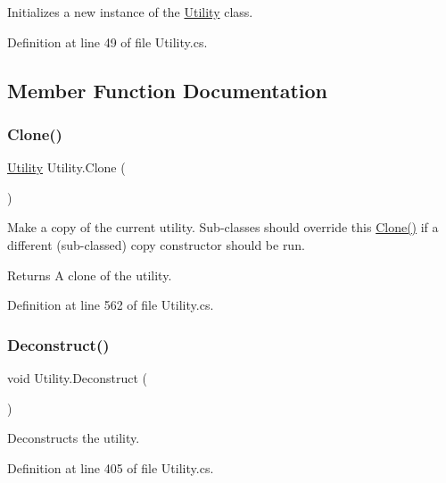 Initializes a new instance of the \hyperlink{class_utility}{Utility} class. 



Definition at line 49 of file Utility.\+cs.



\subsection{Member Function Documentation}
\mbox{\label{class_utility_a54de483d7822530b229a0456780fcc6f}} 
\subsubsection{\texorpdfstring{Clone()}{Clone()}}
{\footnotesize\ttfamily \hyperlink{class_utility}{Utility} Utility.\+Clone (\begin{DoxyParamCaption}{ }\end{DoxyParamCaption})}



Make a copy of the current utility. Sub-\/classes should override this \hyperlink{class_utility_a54de483d7822530b229a0456780fcc6f}{Clone()} if a different (sub-\/classed) copy constructor should be run. 

\begin{DoxyReturn}{Returns}
A clone of the utility.
\end{DoxyReturn}


Definition at line 562 of file Utility.\+cs.

\mbox{\label{class_utility_a30304ee98c9e7f29c66584cbd8e393c0}} 
\subsubsection{\texorpdfstring{Deconstruct()}{Deconstruct()}}
{\footnotesize\ttfamily void Utility.\+Deconstruct (\begin{DoxyParamCaption}{ }\end{DoxyParamCaption})}



Deconstructs the utility. 



Definition at line 405 of file Utility.\+cs.

